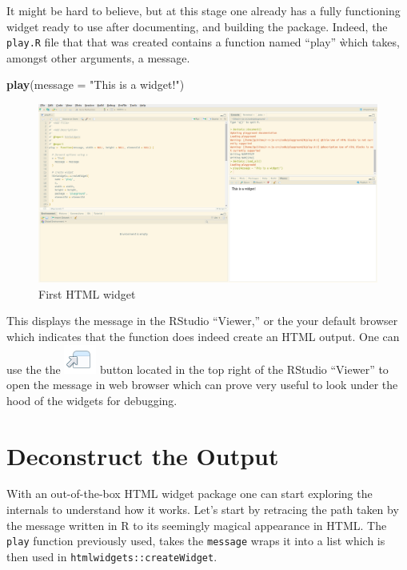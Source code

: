 \documentclass[
]{krantz}
\makeatletter
\newenvironment{Shaded}{\begin{snugshade}}{\end{snugshade}}
\newcommand{\DataTypeTok}[1]{\textcolor[rgb]{0.27,0.27,0.27}{#1}}
\newcommand{\KeywordTok}[1]{\textcolor[rgb]{0.27,0.27,0.27}{\textbf{#1}}}
\newcommand{\NormalTok}[1]{#1}
\newcommand{\StringTok}[1]{\textcolor[rgb]{0.5,0.5,0.5}{#1}}
\newenvironment{kframe}{%
\medskip{}
\setlength{\fboxsep}{.8em}
 \def\at@end@of@kframe{}%
 \ifinner\ifhmode%
  \def\at@end@of@kframe{\end{minipage}}%
  \begin{minipage}{\columnwidth}%
 \fi\fi%
 \def\FrameCommand##1{\hskip\@totalleftmargin \hskip-\fboxsep
 \colorbox{shadecolor}{##1}\hskip-\fboxsep
     \hskip-\linewidth \hskip-\@totalleftmargin \hskip\columnwidth}%
 \MakeFramed {\advance\hsize-\width
   \@totalleftmargin\z@ \linewidth\hsize
   \@setminipage}}%
 {\par\unskip\endMakeFramed%
 \at@end@of@kframe}
\renewenvironment{Shaded}{\begin{kframe}}{\end{kframe}}
\makeatother
\begin{document}
It might be hard to believe, but at this stage one already has a fully functioning widget ready to use after documenting, and building the package. Indeed, the \texttt{play.R} file that that was created contains a function named ``play'' ẁhich takes, amongst other arguments, a message.

\begin{Shaded}
\begin{Highlighting}[]
\KeywordTok{play}\NormalTok{(}\DataTypeTok{message =} \StringTok{"This is a widget!"}\NormalTok{)}
\end{Highlighting}
\end{Shaded}

\begin{figure}
\centering
\includegraphics{images/playground-1.png}
\caption{First HTML widget}
\end{figure}

This displays the message in the RStudio ``Viewer,'' or the your default browser which indicates that the function does indeed create an HTML output. One can use the the \includegraphics{images/open-in-browser.png} button located in the top right of the RStudio ``Viewer'' to open the message in web browser which can prove very useful to look under the hood of the widgets for debugging.

\hypertarget{deconstruct-the-output}{%
\section*{Deconstruct the Output}\label{deconstruct-the-output}}


With an out-of-the-box HTML widget package one can start exploring the internals to understand how it works. Let's start by retracing the path taken by the message written in R to its seemingly magical appearance in HTML. The \texttt{play} function previously used, takes the \texttt{message} wraps it into a list which is then used in \texttt{htmlwidgets::createWidget}.
\end{document}

